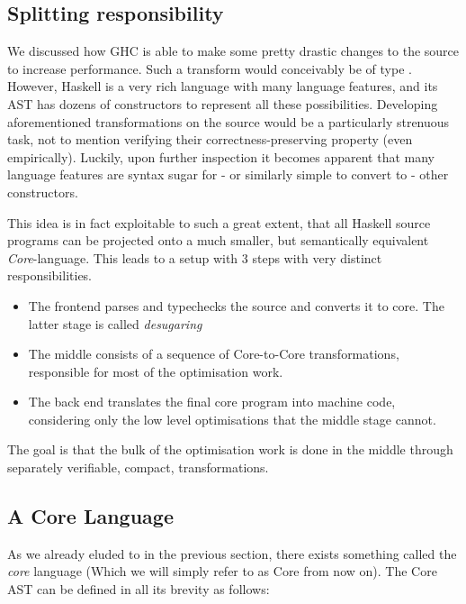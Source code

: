 \subsection{Splitting responsibility}

We discussed how GHC is able to make some pretty drastic changes to the source to increase performance.
Such a transform would conceivably be of type  . However, Haskell is a very rich language
with many language features, and its AST has dozens of constructors to represent all these possibilities.
Developing aforementioned transformations on the source would be a particularly strenuous task, not to mention verifying 
their correctness-preserving property (even empirically). Luckily, upon further inspection it becomes apparent that many
language features are syntax sugar for - or similarly simple to convert to - other constructors.

This idea is in fact exploitable to such a great extent, that all Haskell source programs can be projected onto a much
smaller, but semantically equivalent \textit {Core}-language. This leads to a setup with 3 steps with very distinct responsibilities.

\begin{itemize}
  \item The frontend parses and typechecks the source and converts it to core. The latter stage is called \textit{desugaring}
  \item The middle consists of a sequence of Core-to-Core transformations, responsible for most of the optimisation work.
  \item The back end translates the final core program into machine code, considering only the low level optimisations that the middle stage cannot.
\end{itemize}

The goal is that the bulk of the optimisation work is done in the middle through separately verifiable, compact, transformations. \cite{haskell_optimisations_1997}

\subsection{A Core Language}

As we already eluded to in the previous section, there exists something called the \textit{core} language (Which we will simply refer to as Core from now on).
The Core AST can be defined in all its brevity as follows:

